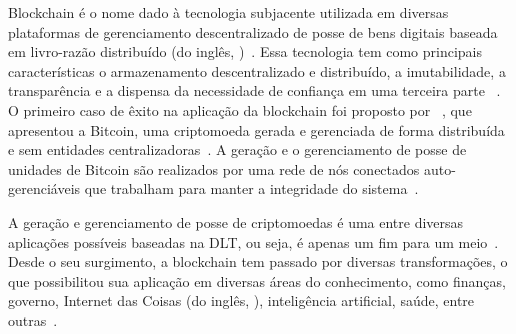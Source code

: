 \newcommand{\comando}[1]{\textbf{$\backslash$#1}}




Blockchain é o nome dado à tecnologia subjacente utilizada em diversas plataformas de gerenciamento descentralizado de posse de bens digitais baseada em livro-razão distribuído (do inglês,  )~\cite{kannengiesser2020trade-offs-acmcs}. Essa tecnologia tem como principais características o armazenamento descentralizado e distribuído, a imutabilidade, a transparência e a dispensa da necessidade de confiança em uma terceira parte ~\cite{fan2020performance, overview-dinh-2018}. O primeiro caso de êxito na aplicação da blockchain foi proposto por ~, que apresentou a Bitcoin, uma criptomoeda gerada e gerenciada de forma distribuída e sem entidades centralizadoras~\cite{zhang2019blockchain-security-acmcs}. A geração e o gerenciamento de posse de unidades de Bitcoin são realizados por uma rede de nós conectados auto-gerenciáveis que trabalham para manter a integridade do sistema~\cite{overview-dinh-2018}. 


A geração e gerenciamento de posse de criptomoedas é uma entre diversas aplicações possíveis baseadas na DLT, ou seja, é apenas um fim para um meio~\cite{overview-blockchainbasic2018drescher}. Desde o seu surgimento, a blockchain tem passado por diversas transformações, o que possibilitou sua aplicação em diversas áreas do conhecimento, como finanças, governo, Internet das Coisas (do inglês, ), inteligência artificial, saúde, entre outras~\cite{swan2015blockchain-book, maesa2020blockchain3.0, zhu2019iot-applications, salah2019review-blockchain-ai, erikson2020survey-health}. 

